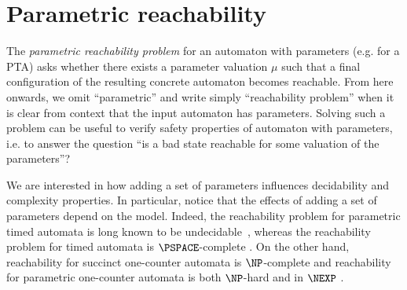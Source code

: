 \section{Parametric reachability}

The {\em parametric reachability problem} for an automaton with parameters (e.g. for a PTA) asks whether there exists a parameter valuation
$\mu$ such that 
a final configuration of the resulting concrete automaton becomes
reachable.
From here onwards, we omit ``parametric'' and
write simply ``reachability problem'' when it is clear from context that the input automaton has parameters.
Solving such a problem can be useful to verify safety
properties of automaton with parameters, i.e. to answer the question ``is a bad state reachable for some valuation
of the parameters''?



We are interested in how adding a set of parameters influences decidability and complexity properties. 
In particular, notice that the effects of adding a set of parameters depend on the model. Indeed, the reachability problem for parametric timed automata is
long known to be undecidable~\cite{AHV93-stoc}, whereas the reachability problem for timed automata is
$\PSPACE$-complete \cite{alur1994theory}. On the other hand,
reachability for succinct one-counter automata %
is $\NP$-complete \cite{HKOW-09concur}
and
reachability for parametric %
one-counter automata %
 is both $\NP$-hard and in $\NEXP$ \cite{haase2012complexity}.


